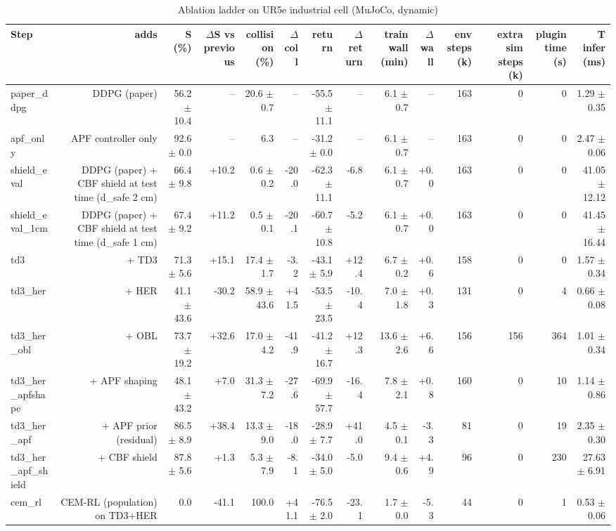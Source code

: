 \begin{table}[t]
\centering
\caption{Ablation ladder on UR5e industrial cell (MuJoCo, dynamic)}
\label{tab:ladder_ur5e}
\small
\begin{tabular}{lrrrrrrrrrrrrr}
\toprule
Step & adds & S (\%) & $\Delta$S vs previous & collision (\%) & $\Delta$coll & return & $\Delta$return & train wall (min) & $\Delta$wall & env steps (k) & extra sim steps (k) & plugin time (s) & T infer (ms) \\
\midrule
paper\_ddpg & DDPG (paper) & 56.2 $\pm$ 10.4 & -- & 20.6 $\pm$ 0.7 & -- & -55.5 $\pm$ 11.1 & -- & 6.1 $\pm$ 0.7 & -- & 163 & 0 & 0 & 1.29 $\pm$ 0.35 \\
apf\_only & APF controller only & 92.6 $\pm$ 0.0 & -- & 6.3 & -- & -31.2 $\pm$ 0.0 & -- & 6.1 $\pm$ 0.7 & -- & 163 & 0 & 0 & 2.47 $\pm$ 0.06 \\
shield\_eval & DDPG (paper) + CBF shield at test time (d\_safe 2 cm) & 66.4 $\pm$ 9.8 & +10.2 & 0.6 $\pm$ 0.2 & -20.0 & -62.3 $\pm$ 11.1 & -6.8 & 6.1 $\pm$ 0.7 & +0.0 & 163 & 0 & 0 & 41.05 $\pm$ 12.12 \\
shield\_eval\_1cm & DDPG (paper) + CBF shield at test time (d\_safe 1 cm) & 67.4 $\pm$ 9.2 & +11.2 & 0.5 $\pm$ 0.1 & -20.1 & -60.7 $\pm$ 10.8 & -5.2 & 6.1 $\pm$ 0.7 & +0.0 & 163 & 0 & 0 & 41.45 $\pm$ 16.44 \\
td3 & + TD3 & 71.3 $\pm$ 5.6 & +15.1 & 17.4 $\pm$ 1.7 & -3.2 & -43.1 $\pm$ 5.9 & +12.4 & 6.7 $\pm$ 0.2 & +0.6 & 158 & 0 & 0 & 1.57 $\pm$ 0.34 \\
td3\_her & + HER & 41.1 $\pm$ 43.6 & -30.2 & 58.9 $\pm$ 43.6 & +41.5 & -53.5 $\pm$ 23.5 & -10.4 & 7.0 $\pm$ 1.8 & +0.3 & 131 & 0 & 4 & 0.66 $\pm$ 0.08 \\
td3\_her\_obl & + OBL & 73.7 $\pm$ 19.2 & +32.6 & 17.0 $\pm$ 4.2 & -41.9 & -41.2 $\pm$ 16.7 & +12.3 & 13.6 $\pm$ 2.6 & +6.6 & 156 & 156 & 364 & 1.01 $\pm$ 0.34 \\
td3\_her\_apfshape & + APF shaping & 48.1 $\pm$ 43.2 & +7.0 & 31.3 $\pm$ 7.2 & -27.6 & -69.9 $\pm$ 57.7 & -16.4 & 7.8 $\pm$ 2.1 & +0.8 & 160 & 0 & 10 & 1.14 $\pm$ 0.86 \\
td3\_her\_apf & + APF prior (residual) & 86.5 $\pm$ 8.9 & +38.4 & 13.3 $\pm$ 9.0 & -18.0 & -28.9 $\pm$ 7.7 & +41.0 & 4.5 $\pm$ 0.1 & -3.3 & 81 & 0 & 19 & 2.35 $\pm$ 0.30 \\
td3\_her\_apf\_shield & + CBF shield & 87.8 $\pm$ 5.6 & +1.3 & 5.3 $\pm$ 7.9 & -8.1 & -34.0 $\pm$ 5.0 & -5.0 & 9.4 $\pm$ 0.6 & +4.9 & 96 & 0 & 230 & 27.63 $\pm$ 6.91 \\
cem\_rl & CEM-RL (population) on TD3+HER & 0.0 & -41.1 & 100.0 & +41.1 & -76.5 $\pm$ 2.0 & -23.1 & 1.7 $\pm$ 0.0 & -5.3 & 44 & 0 & 1 & 0.53 $\pm$ 0.06 \\

\end{tabular}
\end{table}

